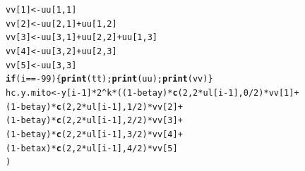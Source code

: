 \documentclass{article}\usepackage[]{graphicx}\usepackage[]{color}
\makeatletter
\newcommand{\hlnum}[1]{\textcolor[rgb]{0.686,0.059,0.569}{#1}}%
\newcommand{\hlopt}[1]{\textcolor[rgb]{0,0,0}{#1}}%
\newcommand{\hlstd}[1]{\textcolor[rgb]{0.345,0.345,0.345}{#1}}%
\newcommand{\hlkwa}[1]{\textcolor[rgb]{0.161,0.373,0.58}{\textbf{#1}}}%
\newcommand{\hlkwb}[1]{\textcolor[rgb]{0.69,0.353,0.396}{#1}}%
\newcommand{\hlkwd}[1]{\textcolor[rgb]{0.737,0.353,0.396}{\textbf{#1}}}%
\newenvironment{kframe}{%
 \def\at@end@of@kframe{}%
 \ifinner\ifhmode%
  \def\at@end@of@kframe{\end{minipage}}%
  \begin{minipage}{\columnwidth}%
 \fi\fi%
 \def\FrameCommand##1{\hskip\@totalleftmargin \hskip-\fboxsep
 \colorbox{shadecolor}{##1}\hskip-\fboxsep
     \hskip-\linewidth \hskip-\@totalleftmargin \hskip\columnwidth}%
 \MakeFramed {\advance\hsize-\width
   \@totalleftmargin\z@ \linewidth\hsize
   \@setminipage}}%
 {\par\unskip\endMakeFramed%
 \at@end@of@kframe}
\newenvironment{knitrout}{}{} %
\makeatother
\begin{document}
\begin{knitrout}
\begin{kframe}
\begin{alltt}
      \hlstd{vv[}\hlnum{1}\hlstd{]} \hlkwb{<-} \hlstd{uu[}\hlnum{1}\hlstd{,}\hlnum{1}\hlstd{]}
      \hlstd{vv[}\hlnum{2}\hlstd{]} \hlkwb{<-} \hlstd{uu[}\hlnum{2}\hlstd{,}\hlnum{1}\hlstd{]}\hlopt{+}\hlstd{uu[}\hlnum{1}\hlstd{,}\hlnum{2}\hlstd{]}
      \hlstd{vv[}\hlnum{3}\hlstd{]} \hlkwb{<-} \hlstd{uu[}\hlnum{3}\hlstd{,}\hlnum{1}\hlstd{]}\hlopt{+}\hlstd{uu[}\hlnum{2}\hlstd{,}\hlnum{2}\hlstd{]}\hlopt{+}\hlstd{uu[}\hlnum{1}\hlstd{,}\hlnum{3}\hlstd{]}
      \hlstd{vv[}\hlnum{4}\hlstd{]} \hlkwb{<-} \hlstd{uu[}\hlnum{3}\hlstd{,}\hlnum{2}\hlstd{]}\hlopt{+}\hlstd{uu[}\hlnum{2}\hlstd{,}\hlnum{3}\hlstd{]}
      \hlstd{vv[}\hlnum{5}\hlstd{]} \hlkwb{<-} \hlstd{uu[}\hlnum{3}\hlstd{,}\hlnum{3}\hlstd{]}
      \hlkwa{if}\hlstd{(i}\hlopt{==-}\hlnum{99}\hlstd{)\{} \hlkwd{print}\hlstd{(tt);} \hlkwd{print}\hlstd{(uu);} \hlkwd{print}\hlstd{(vv) \}}
      \hlstd{hc.y.mito} \hlkwb{<-} \hlstd{y[i}\hlopt{-}\hlnum{1}\hlstd{]} \hlopt{*} \hlnum{2}\hlopt{^}\hlstd{k} \hlopt{*} \hlstd{((}\hlnum{1}\hlopt{-}\hlstd{betay)} \hlopt{*} \hlkwd{c}\hlstd{(}\hlnum{2}\hlstd{,} \hlnum{2}\hlopt{*}\hlstd{ul[i}\hlopt{-}\hlnum{1}\hlstd{],} \hlnum{0}\hlopt{/}\hlnum{2}\hlstd{)} \hlopt{*} \hlstd{vv[}\hlnum{1}\hlstd{]} \hlopt{+}
                                   \hlstd{(}\hlnum{1}\hlopt{-}\hlstd{betay)} \hlopt{*} \hlkwd{c}\hlstd{(}\hlnum{2}\hlstd{,} \hlnum{2}\hlopt{*}\hlstd{ul[i}\hlopt{-}\hlnum{1}\hlstd{],} \hlnum{1}\hlopt{/}\hlnum{2}\hlstd{)} \hlopt{*} \hlstd{vv[}\hlnum{2}\hlstd{]} \hlopt{+}
                                   \hlstd{(}\hlnum{1}\hlopt{-}\hlstd{betay)} \hlopt{*} \hlkwd{c}\hlstd{(}\hlnum{2}\hlstd{,} \hlnum{2}\hlopt{*}\hlstd{ul[i}\hlopt{-}\hlnum{1}\hlstd{],} \hlnum{2}\hlopt{/}\hlnum{2}\hlstd{)} \hlopt{*} \hlstd{vv[}\hlnum{3}\hlstd{]} \hlopt{+}
                                   \hlstd{(}\hlnum{1}\hlopt{-}\hlstd{betay)} \hlopt{*} \hlkwd{c}\hlstd{(}\hlnum{2}\hlstd{,} \hlnum{2}\hlopt{*}\hlstd{ul[i}\hlopt{-}\hlnum{1}\hlstd{],} \hlnum{3}\hlopt{/}\hlnum{2}\hlstd{)} \hlopt{*} \hlstd{vv[}\hlnum{4}\hlstd{]} \hlopt{+}
                                   \hlstd{(}\hlnum{1}\hlopt{-}\hlstd{betax)} \hlopt{*} \hlkwd{c}\hlstd{(}\hlnum{2}\hlstd{,} \hlnum{2}\hlopt{*}\hlstd{ul[i}\hlopt{-}\hlnum{1}\hlstd{],} \hlnum{4}\hlopt{/}\hlnum{2}\hlstd{)} \hlopt{*} \hlstd{vv[}\hlnum{5}\hlstd{]}
                                  \hlstd{)}


\end{alltt}
\end{kframe}
\end{knitrout}
\end{document}
